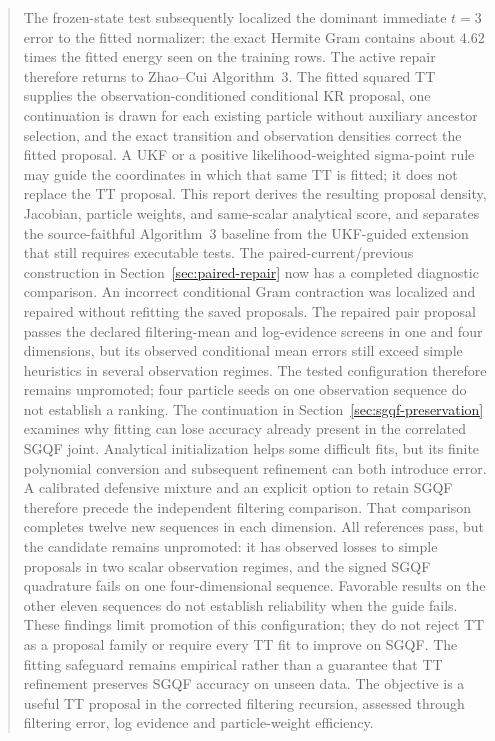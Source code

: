 \documentclass[11pt]{article}
\begin{document}
\begin{abstract}
The frozen-state test subsequently localized the dominant immediate $t=3$
error to the fitted normalizer: the exact Hermite Gram contains about $4.62$
times the fitted energy seen on the training rows.  The active repair therefore
returns to Zhao--Cui Algorithm~3.  The fitted squared TT supplies the
observation-conditioned conditional KR proposal, one continuation is drawn for
each existing particle without auxiliary ancestor selection, and the exact
transition and observation densities correct the fitted proposal.  A UKF or a
positive likelihood-weighted sigma-point rule may guide the coordinates in
which that same TT is fitted; it does not replace the TT proposal.  This report
derives the resulting proposal density, Jacobian, particle weights, and
same-scalar analytical score, and separates the source-faithful Algorithm~3
baseline from the UKF-guided extension that still requires executable tests.
The paired-current/previous construction in Section~\ref{sec:paired-repair}
now has a completed diagnostic comparison. An incorrect conditional Gram
contraction was localized and repaired without refitting the saved proposals.
The repaired pair proposal passes the declared filtering-mean and log-evidence
screens in one and four dimensions, but its observed conditional mean errors
still exceed simple heuristics in several observation regimes. The tested
configuration therefore remains unpromoted; four particle seeds on one
observation sequence do not establish a ranking.
The continuation in Section~\ref{sec:sgqf-preservation} examines why fitting can
lose accuracy already present in the correlated SGQF joint. Analytical
initialization helps some difficult fits, but its finite polynomial conversion
and subsequent refinement can both introduce error. A calibrated defensive
mixture and an explicit option to retain SGQF therefore precede the independent
filtering comparison. That comparison completes twelve new sequences in each
dimension. All references pass, but the candidate remains unpromoted: it has
observed losses to simple proposals in two scalar observation regimes, and
the signed SGQF quadrature fails on one four-dimensional sequence. Favorable
results on the other eleven sequences do not establish reliability when the
guide fails. These findings limit promotion of this configuration; they do not
reject TT as a proposal family or require every TT fit to improve on SGQF.
The fitting safeguard remains empirical rather than a guarantee that TT
refinement preserves SGQF accuracy on unseen data. The objective is a useful
TT proposal in the corrected filtering recursion, assessed through filtering
error, log evidence and particle-weight efficiency.
\end{abstract}
\end{document}
